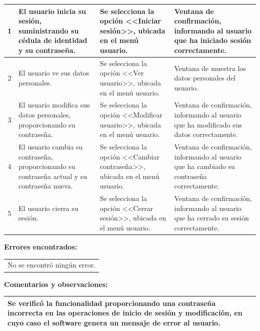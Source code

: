 {\begin{table}[h]
\begin{tabulary}{\anchotabla}{|c|J|J|J|}
			1 & El usuario inicia su sesi\'{o}n, suministrando su c\'{e}dula de identidad y su contrase\~{n}a. & Se selecciona la opci\'{o}n <<Iniciar sesi\'{o}n>>, ubicada en el men\'{u} usuario. & Ventana de confirmaci\'{o}n, informando al usuario que ha iniciado sesi\'{o}n correctamente.\\ \hline
		
			2 & El usuario ve sus datos personales. & Se selecciona la opci\'{o}n <<Ver usuario>>, ubicada en el men\'{u} usuario. & Ventana de muestra los datos personales del usuario.\\ \hline
			
			3 & El usuario modifica sus datos personales, proporcionando su contrase\~{n}a. & Se selecciona la opci\'{o}n <<Modificar usuario>>, ubicada en el men\'{u} usuario. & Ventana de confirmaci\'{o}n, informando al usuario que ha modificado sus datos correctamente.\\ \hline
			
			4 & El usuario cambia su contrase\~{n}a, proporcionando su contrase\~{n}a actual y su contrase\~{n}a nueva. & Se selecciona la opci\'{o}n <<Cambiar contrase\~{n}a>>, ubicada en el men\'{u} usuario. & Ventana de confirmaci\'{o}n, informando al usuario que ha cambiado su contrase\~{n}a correctamente.\\ \hline
			
			5 & El usuario cierra su sesi\'{o}n. & Se selecciona la opci\'{o}n <<Cerrar sesi\'{o}n>>, ubicada en el men\'{u} usuario. & Ventana de confirmaci\'{o}n, informando al usuario que ha cerrado su sesi\'{o}n correctamente.\\ \hline
		\end{tabulary}
\end{table}
\vfill
\newpage
\textbf{Errores encontrados:}
\begin{table}[H]
	\centering
	\setlength{\extrarowheight}{\altocelda}
	\begin{tabularx}{\anchotabla}{|X|}
		\hline
		\thead{\textbf{\small{Descripci\'{o}n del error}}}
		\\ \hline
		No se encontr\'{o} ning\'{u}n error.\\ \hline
	\end{tabularx}
\end{table}

\textbf{Comentarios y observaciones:}
\begin{table}[H]
	\centering
	\setlength{\extrarowheight}{\altocelda}
	\begin{tabularx}{\anchotabla}{|X|}
		\hline
		Se verific\'{o} la funcionalidad proporcionando una contrase\~{n}a incorrecta en las operaciones de inicio de sesi\'{o}n y modificaci\'{o}n, en cuyo caso el software genera un mensaje de error al usuario.\\ \hline
	\end{tabularx}
\end{table}

}
